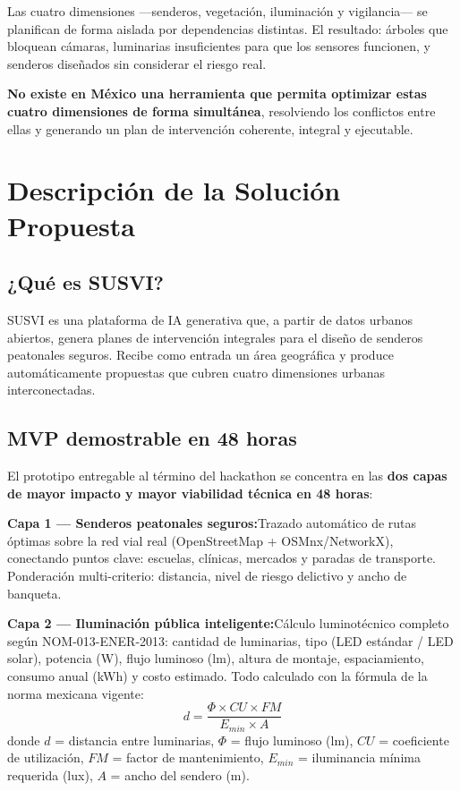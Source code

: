 \documentclass[12pt,a4paper]{article}
\newcommand{\capamvp}[2]{%
  \noindent\textbf{\color{azuloscuro}#1}\quad #2\par\vspace{4pt}%
}
\begin{document}
Las cuatro dimensiones —senderos, vegetación, iluminación y vigilancia— se planifican de forma aislada por dependencias distintas. El resultado: árboles que bloquean cámaras, luminarias insuficientes para que los sensores funcionen, y senderos diseñados sin considerar el riesgo real.

\begin{tagline}
\textbf{No existe en México una herramienta que permita optimizar estas cuatro dimensiones de forma simultánea}, resolviendo los conflictos entre ellas y generando un plan de intervención coherente, integral y ejecutable.
\end{tagline}


\newpage
\section{Descripción de la Solución Propuesta}

\subsection{¿Qué es SUSVI?}

SUSVI es una plataforma de IA generativa que, a partir de datos urbanos abiertos, genera planes de intervención integrales para el diseño de senderos peatonales seguros. Recibe como entrada un área geográfica y produce automáticamente propuestas que cubren cuatro dimensiones urbanas interconectadas.

\subsection{MVP demostrable en 48 horas}

El prototipo entregable al término del hackathon se concentra en las \textbf{dos capas de mayor impacto y mayor viabilidad técnica en 48 horas}:

\begin{tcolorbox}[cajaverde, title=Capas del MVP — Completamente Funcionales en Demo]
\capamvp{Capa 1 — Senderos peatonales seguros:}{Trazado automático de rutas óptimas sobre la red vial real (OpenStreetMap + OSMnx/NetworkX), conectando puntos clave: escuelas, clínicas, mercados y paradas de transporte. Ponderación multi-criterio: distancia, nivel de riesgo delictivo y ancho de banqueta.}

\smallskip
\capamvp{Capa 2 — Iluminación pública inteligente:}{Cálculo luminotécnico completo según NOM-013-ENER-2013: cantidad de luminarias, tipo (LED estándar / LED solar), potencia (W), flujo luminoso (lm), altura de montaje, espaciamiento, consumo anual (kWh) y costo estimado. Todo calculado con la fórmula de la norma mexicana vigente:
\[
d = \frac{\Phi \times CU \times FM}{E_{min} \times A}
\]
donde $d$ = distancia entre luminarias, $\Phi$ = flujo luminoso (lm), $CU$ = coeficiente de utilización, $FM$ = factor de mantenimiento, $E_{min}$ = iluminancia mínima requerida (lux), $A$ = ancho del sendero (m).}
\end{tcolorbox}
\end{document}
